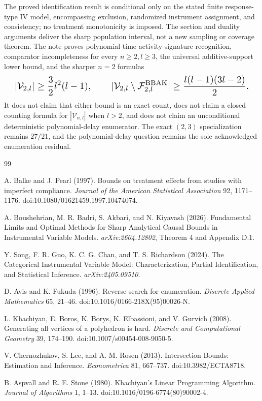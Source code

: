 \documentclass{article}
\begin{document}
The proved identification result is conditional only on the stated finite response-type IV model, encompassing exclusion, randomized instrument assignment, and consistency; no treatment monotonicity is imposed. The section and duality arguments deliver the sharp population interval, not a new sampling or coverage theorem. The note proves polynomial-time activity-signature recognition, comparator incompleteness for every \(n\ge2,l\ge3\), the universal additive-support lower bound, and the sharper \(n=2\) formulas
\[
\makebox[\linewidth][c]{\resizebox{0.98\linewidth}{!}{\par\noindent \makebox[\linewidth][c]{\resizebox{0.98\linewidth}{!}{\(\displaystyle \displaystyle |\mathcal V_{2,l}|\ge\frac32l^2(l-1),\qquad |\mathcal V_{2,l}\setminus\mathcal F^{\mathrm{BBAK}}_{2,l}|\ge\frac{l(l-1)(3l-2)}2.\)}}\par\noindent}}
\]
It does not claim that either bound is an exact count, does not claim a closed counting formula for \(|\mathcal V_{n,l}|\) when \(l>2\), and does not claim an unconditional deterministic polynomial-delay enumerator. The exact \((2,3)\) specialization remains \(27/21\), and the polynomial-delay question remains the sole acknowledged enumeration residual.

\begin{thebibliography}{99}

   A. Balke and J. Pearl (1997). Bounds on treatment effects from studies with imperfect compliance. \textit{Journal of the American Statistical Association} 92, 1171--1176. doi:10.1080/01621459.1997.10474074.

   A. Boushehrian, M. R. Badri, S. Akbari, and N. Kiyavash (2026). Fundamental Limits and Optimal Methods for Sharp Analytical Causal Bounds in Instrumental Variable Models. \textit{arXiv:2604.12802}, Theorem 4 and Appendix D.1.

   Y. Song, F. R. Guo, K. C. G. Chan, and T. S. Richardson (2024). The Categorical Instrumental Variable Model: Characterization, Partial Identification, and Statistical Inference. \textit{arXiv:2405.09510}.

   D. Avis and K. Fukuda (1996). Reverse search for enumeration. \textit{Discrete Applied Mathematics} 65, 21--46. doi:10.1016/0166-218X(95)00026-N.

   L. Khachiyan, E. Boros, K. Borys, K. Elbassioni, and V. Gurvich (2008). Generating all vertices of a polyhedron is hard. \textit{Discrete and Computational Geometry} 39, 174--190. doi:10.1007/s00454-008-9050-5.

   V. Chernozhukov, S. Lee, and A. M. Rosen (2013). Intersection Bounds: Estimation and Inference. \textit{Econometrica} 81, 667--737. doi:10.3982/ECTA8718.

   B. Aspvall and R. E. Stone (1980). Khachiyan's Linear Programming Algorithm. \textit{Journal of Algorithms} 1, 1--13. doi:10.1016/0196-6774(80)90002-4.

\end{thebibliography}
\end{document}
